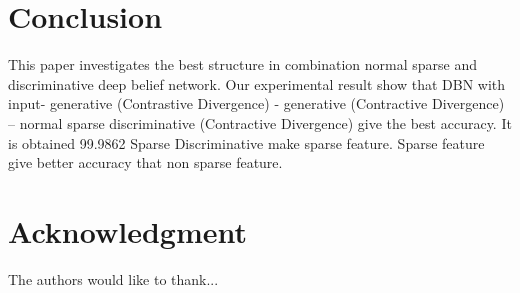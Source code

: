 \documentclass[conference]{IEEEtran}
\begin{document}
\section{Conclusion}
This paper investigates the best structure in combination
normal sparse and discriminative deep belief network. Our
experimental result show that DBN with input- generative
(Contrastive Divergence) - generative (Contractive
Divergence) – normal sparse discriminative (Contractive
Divergence) give the best accuracy. It is obtained 99.9862%
Sparse Discriminative make sparse feature. Sparse feature
give better accuracy that non sparse feature.


\section*{Acknowledgment}


The authors would like to thank...









\end{document}
